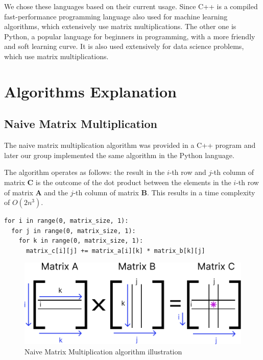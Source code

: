 \documentclass[sigconf,balance,nonacm]{acmart}
\begin{document}
We chose these languages based on their current usage. Since C++ is a compiled fast-performance programming language also used for machine learning algorithms, which extensively use matrix multiplications. The other one is Python, a popular language for beginners in programming, with a more friendly and soft learning curve. It is also used extensively for data science problems, which use matrix multiplications.

\section{Algorithms Explanation}

\subsection{Naive Matrix Multiplication}

The naive matrix multiplication algorithm was provided in a C++ program and later our group implemented the same algorithm in the Python language.

The algorithm operates as follows: the result in the $i$-th row and $j$-th column of matrix $\mathbf{C}$ is the outcome of the dot product between the elements in the $i$-th row of matrix $\mathbf{A}$ and the $j$-th column of matrix $\mathbf{B}$. This results in a time complexity of $O(2n^3)$.

\begin{minipage}{\linewidth}
    \begin{lstlisting}
for i in range(0, matrix_size, 1):
  for j in range(0, matrix_size, 1):
    for k in range(0, matrix_size, 1):
      matrix_c[i][j] += matrix_a[i][k] * matrix_b[k][j]
\end{lstlisting}
\end{minipage}

\begin{figure}[H]
    \centering
    \includegraphics[width=0.8\columnwidth]{figures/naive.png}
    \caption{Naive Matrix Multiplication algorithm illustration}
    \label{fig:naive_illustration}
\end{figure}
\end{document}
